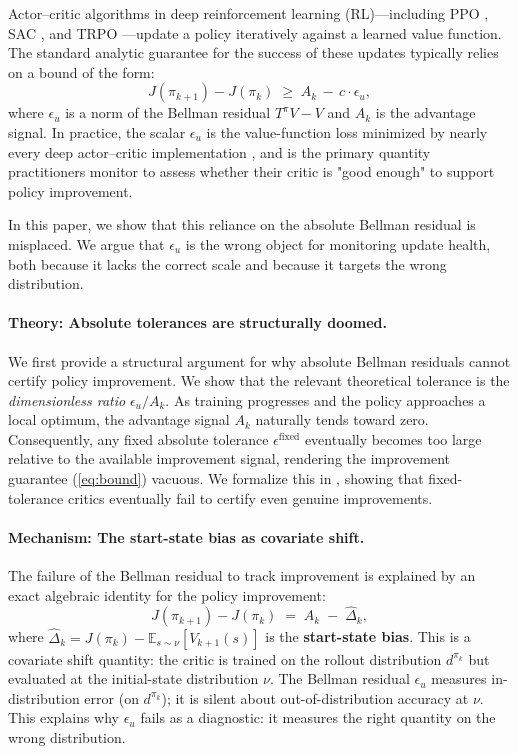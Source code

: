 \documentclass[11pt]{article}
\begin{document}
Actor--critic algorithms in deep reinforcement learning (RL)---including PPO \citep{schulman2017proximal}, SAC \citep{haarnoja2018soft}, and TRPO \citep{schulman2015trust}---update a policy iteratively against a learned value function. The standard analytic guarantee for the success of these updates typically relies on a bound of the form:
\begin{equation}
\label{eq:bound}
J(\pi_{k+1}) - J(\pi_k) \;\geq\; A_k \,-\, c \cdot \epsilon_u,
\end{equation}
where $\epsilon_u$ is a norm of the Bellman residual $T^\pi V - V$ and $A_k$ is the advantage signal. In practice, the scalar $\epsilon_u$ is the value-function loss minimized by nearly every deep actor--critic implementation \citep{huang202237,andrychowicz2021what}, and is the primary quantity practitioners monitor to assess whether their critic is "good enough" to support policy improvement.

In this paper, we show that this reliance on the absolute Bellman residual is misplaced. We argue that $\epsilon_u$ is the wrong object for monitoring update health, both because it lacks the correct scale and because it targets the wrong distribution.

\paragraph{Theory: Absolute tolerances are structurally doomed.}
We first provide a structural argument for why absolute Bellman residuals cannot certify policy improvement. We show that the relevant theoretical tolerance is the \emph{dimensionless ratio} $\epsilon_u / A_k$. As training progresses and the policy approaches a local optimum, the advantage signal $A_k$ naturally tends toward zero. Consequently, any fixed absolute tolerance $\epsilon^{\text{fixed}}$ eventually becomes too large relative to the available improvement signal, rendering the improvement guarantee (\ref{eq:bound}) vacuous. We formalize this in , showing that fixed-tolerance critics eventually fail to certify even genuine improvements.

\paragraph{Mechanism: The start-state bias as covariate shift.}
The failure of the Bellman residual to track improvement is explained by an exact algebraic identity for the policy improvement:
\begin{equation}
\label{eq:identity-intro}
J(\pi_{k+1}) - J(\pi_k) \;=\; A_k \;-\; \hat\Delta_k,
\end{equation}
where $\hat\Delta_k = J(\pi_k) - \mathbb{E}_{s \sim \nu}[V_{k+1}(s)]$ is the \textbf{start-state bias}. This is a covariate shift quantity: the critic is trained on the rollout distribution $d^{\pi_k}$ but evaluated at the initial-state distribution $\nu$. The Bellman residual $\epsilon_u$ measures in-distribution error (on $d^{\pi_k}$); it is silent about out-of-distribution accuracy at $\nu$. This explains why $\epsilon_u$ fails as a diagnostic: it measures the right quantity on the wrong distribution.
\end{document}
